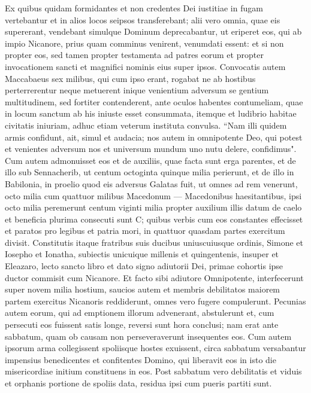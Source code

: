 \begin{biblechapter}
\verse Ex quibus quidam formidantes et non credentes Dei iustitiae in fugam vertebantur et in alios locos seipsos transferebant; 
\verse alii vero omnia, quae eis supererant, vendebant simulque Dominum deprecabantur, ut eriperet eos, qui ab impio Nicanore, prius quam comminus venirent, venumdati essent: 
\verse et si non propter eos, sed tamen propter testamenta ad patres eorum et propter invocationem sancti et magnifici nominis eius super ipsos. 
\verse Convocatis autem Maccabaeus sex milibus, qui cum ipso erant, rogabat ne ab hostibus perterrerentur neque metuerent inique venientium adversum se gentium multitudinem, sed fortiter contenderent, 
\verse ante oculos habentes contumeliam, quae in locum sanctum ab his iniuste esset consummata, itemque et ludibrio habitae civitatis iniuriam, adhuc etiam veterum instituta convulsa.  
\verse “Nam illi quidem armis confidunt, ait, simul et audacia; nos autem in omnipotente Deo, qui potest et venientes adversum nos et universum mundum uno nutu delere, confidimus". 
\verse Cum autem admonuisset eos et de auxiliis, quae facta sunt erga parentes, et de illo sub Sennacherib, ut centum octoginta quinque milia perierunt, 
\verse et de illo in Babilonia, in proelio quod eis adversus Galatas fuit, ut omnes ad rem venerunt, octo milia cum quattuor milibus Macedonum — Macedonibus haesitantibus, ipsi octo milia peremerunt centum viginti milia propter auxilium illis datum de caelo et beneficia plurima consecuti sunt C; 
\verse quibus verbis cum eos constantes effecisset et paratos pro legibus et patria mori, in quattuor quasdam partes exercitum divisit. 
\verse Constitutis itaque fratribus suis ducibus uniuscuiusque ordinis, Simone et Iosepho et Ionatha, subiectis unicuique millenis et quingentenis, 
\verse insuper et Eleazaro, lecto sancto libro et dato signo adiutorii Dei, primae cohortis ipse ductor commisit cum Nicanore. 
\verse Et facto sibi adiutore Omnipotente, interfecerunt super novem milia hostium, saucios autem et membris debilitatos maiorem partem exercitus Nicanoris reddiderunt, omnes vero fugere compulerunt.  
\verse Pecunias autem eorum, qui ad emptionem illorum advenerant, abstulerunt et, cum persecuti eos fuissent satis longe, reversi sunt hora conclusi; 
\verse nam erat ante sabbatum, quam ob causam non perseveraverunt insequentes eos. 
\verse Cum autem ipsorum arma collegissent spoliisque hostes exuissent, circa sabbatum versabantur impensius benedicentes et confitentes Domino, qui liberavit eos in isto die misericordiae initium constituens in eos. 
\verse Post sabbatum vero debilitatis et viduis et orphanis portione de spoliis data, residua ipsi cum pueris partiti sunt. 

\end{biblechapter}
